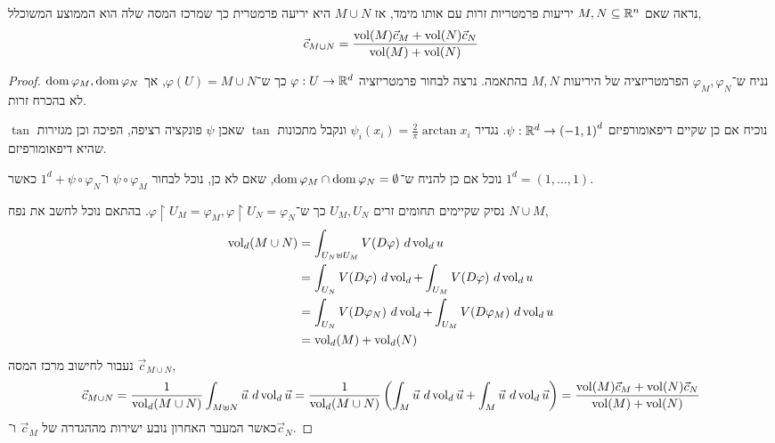 \subquestion{}
נראה שאם $M, N \subseteq \mathbb{R}^n$ יריעות פרמטריות זרות עם אותו מימד,
אז $M \cup N$ היא יריעה פרמטרית כך שמרכז המסה שלה הוא הממוצע המשוכלל,
\[
	\vec{c}_{M \cup N}
	= \frac{\operatorname{vol}(M) \vec{c}_M + \operatorname{vol}(N) \vec{c}_N}{\operatorname{vol}(M) + \operatorname{vol}(N)}
\]
\begin{proof}
	נניח ש־$\varphi_M, \varphi_N$ הפרמטריזציה של היריעות $M, N$ בהתאמה.
	נרצה לבחור פרמטריזציה $\varphi : U \to \mathbb{R}^d$ כך ש־$\varphi(U) = M \cup N$, אך $\operatorname{dom} \varphi_M, \operatorname{dom} \varphi_N$ לא בהכרח זרות.

	נוכיח אם כן שקיים דיפאומורפיזם $\psi : \mathbb{R}^d \to {(-1, 1)}^d$.
	נגדיר $\psi_i(x_i) = \frac{2}{\pi} \arctan x_i$ ונקבל מתכונות $\tan$ שאכן $\psi$ פונקציה רציפה, הפיכה וכן מגזירות $\tan$ שהיא דיפאומורפיזם.

	נוכל אם כן להניח ש־$\operatorname{dom} \varphi_M \cap \operatorname{dom} \varphi_N = \emptyset$, שאם לא כן, נוכל לבחור $\psi \circ \varphi_M$ ו־$1^d + \psi \circ \varphi_N$ כאשר $1^d = (1, \ldots, 1)$.

	נסיק שקיימים תחומים זרים $U_M, U_N$ כך ש־$\varphi \restriction U_M = \varphi_M, \varphi \restriction U_N = \varphi_N$.
	בהתאם נוכל לחשב את נפח $N \cup M$,
	\begin{align*}
		\operatorname{vol}_d(M \cup N)
		& = \int_{U_N \uplus U_M} V(D\varphi)\ d\operatorname{vol}_d u \\
		& = \int_{U_N} V(D\varphi)\ d\operatorname{vol}_d + \int_{U_M} V(D\varphi)\ d\operatorname{vol}_d u \\
		& = \int_{U_N} V(D\varphi_N)\ d\operatorname{vol}_d + \int_{U_M} V(D\varphi_M)\ d\operatorname{vol}_d u \\
		& = \operatorname{vol}_d(M) + \operatorname{vol}_d(N)
	\end{align*}
	נעבור לחישוב מרכז המסה $\vec{c}_{M \cup N}$,
	\[
		\vec{c}_{M \cup N}
		= \frac{1}{\operatorname{vol}_d(M \cup N)} \int_{M \uplus N} \vec{u}\ d\operatorname{vol}_d \vec{u}
		= \frac{1}{\operatorname{vol}_d(M \cup N)} \left( \int_{M} \vec{u}\ d\operatorname{vol}_d \vec{u} + \int_{M} \vec{u}\ d\operatorname{vol}_d \vec{u} \right)
		= \frac{\operatorname{vol}(M) \vec{c}_M + \operatorname{vol}(N) \vec{c}_N}{\operatorname{vol}(M) + \operatorname{vol}(N)}
	\]
	כאשר המעבר האחרון נובע ישירות מההגדרה של $\vec{c}_M$ ו־$\vec{c}_N$.
\end{proof}


